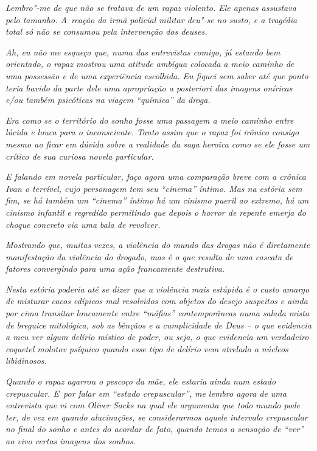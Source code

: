 \emph{Lembro"-me de que não se tratava de um rapaz violento. Ele apenas
assustava pelo tamanho. A~reação da irmã policial militar deu"-se no
susto, e a tragédia total só não se consumou pela intervenção dos
deuses.}~

\emph{Ah, eu não me esqueço que, numa das entrevistas comigo, já estando
bem orientado, o rapaz mostrou uma atitude ambígua colocada a meio
caminho de uma possessão e de uma experiência escolhida. Eu fiquei sem
saber até que ponto teria havido da parte dele uma apropriação a
posteriori das imagens oníricas e/ou também psicóticas na viagem
``química'' da droga.}~

\emph{Era como se o território do sonho fosse uma passagem a meio
caminho entre lúcida e louca para o inconsciente. Tanto assim que o
rapaz foi irônico consigo mesmo ao ficar em dúvida sobre a realidade da
saga heroica como se ele fosse um crítico de sua curiosa novela
particular.}~

\emph{E falando em novela particular, faço agora uma comparação breve
com a crônica Ivan o terrível, cujo personagem tem seu ``cinema''
íntimo. Mas na estória sem fim, se há também um ``cinema'' íntimo há um
cinismo pueril ao extremo, há um cinismo infantil e regredido permitindo
que depois o horror de repente emerja do choque concreto via uma bala de
revolver.}~

\emph{Mostrando que, muitas vezes, a violência do mundo das drogas não é
diretamente manifestação da violência do drogado, mas é o que resulta de
uma cascata de fatores convergindo para uma ação francamente
destrutiva.}~

\emph{Nesta estória poderia até se dizer que a violência mais estúpida é
o custo amargo de misturar cacos edípicos mal resolvidos com objetos do
desejo suspeitos e ainda por cima transitar loucamente entre ``máfias''
contemporâneas numa salada mista de breguice mitológica, sob as bênçãos
e a cumplicidade de Deus -- o que evidencia a meu ver algum delírio
místico de poder, ou seja, o que evidencia um verdadeiro coquetel
molotov psíquico quando esse tipo de delírio vem atrelado a núcleos
libidinosos.}~

\emph{Quando o rapaz agarrou o pescoço da mãe, ele estaria ainda num
estado crepuscular. E~por falar em ``estado crepuscular'', me lembro
agora de uma entrevista que vi com Oliver Sacks na qual ele argumenta
que todo mundo pode ter, de vez em quando alucinações, se considerarmos
aquele intervalo crepuscular no final do sonho e antes do acordar de
fato, quando temos a sensação de ``ver'' ao vivo certas imagens dos
sonhos.}~

